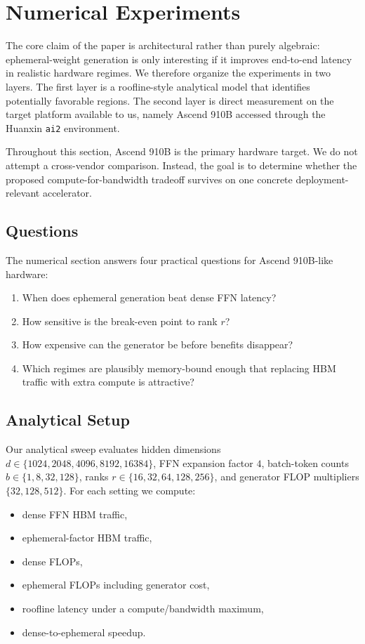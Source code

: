 \documentclass[11pt]{article}
\begin{document}
\section{Numerical Experiments}
The core claim of the paper is architectural rather than purely algebraic: ephemeral-weight generation is only interesting if it improves end-to-end latency in realistic hardware regimes. We therefore organize the experiments in two layers. The first layer is a roofline-style analytical model that identifies potentially favorable regions. The second layer is direct measurement on the target platform available to us, namely Ascend 910B accessed through the Huanxin \texttt{ai2} environment.

Throughout this section, Ascend 910B is the primary hardware target. We do not attempt a cross-vendor comparison. Instead, the goal is to determine whether the proposed compute-for-bandwidth tradeoff survives on one concrete deployment-relevant accelerator.

\subsection{Questions}
The numerical section answers four practical questions for Ascend 910B-like hardware:
\begin{enumerate}
\item When does ephemeral generation beat dense FFN latency?
\item How sensitive is the break-even point to rank $r$?
\item How expensive can the generator be before benefits disappear?
\item Which regimes are plausibly memory-bound enough that replacing HBM traffic with extra compute is attractive?
\end{enumerate}

\subsection{Analytical Setup}
Our analytical sweep evaluates hidden dimensions $d \in \{1024,2048,4096,8192,16384\}$, FFN expansion factor $4$, batch-token counts $b \in \{1,8,32,128\}$, ranks $r \in \{16,32,64,128,256\}$, and generator FLOP multipliers $\{32,128,512\}$. For each setting we compute:
\begin{itemize}
\item dense FFN HBM traffic,
\item ephemeral-factor HBM traffic,
\item dense FLOPs,
\item ephemeral FLOPs including generator cost,
\item roofline latency under a compute/bandwidth maximum,
\item dense-to-ephemeral speedup.
\end{itemize}
\end{document}
